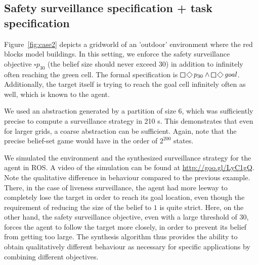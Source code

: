 \subsection{Safety surveillance specification + task specification}
Figure~\ref{fig:case2} depicts a gridworld of an 'outdoor' environment where the red blocks model buildings. 
In this setting, we enforce the safety surveillance objective $\square p_{30}$ (the belief size should never exceed 30) in addition to infinitely often reaching the green cell. The formal specification is $\LTLglobally\LTLfinally p_{30} \wedge \LTLglobally\LTLfinally \mathit{goal}$. Additionally, the target itself is trying to reach the goal cell infinitely often as well, which is known to the agent.

We used an abstraction generated by a partition of size 6, which was sufficiently precise to compute a surveillance strategy in 210 s. This demonstrates that even for larger grids, a coarse abstraction can be sufficient. Again, note that the precise belief-set game would have in the order of $2^{200}$ states.
 
We simulated the environment and the synthesized surveillance strategy for the agent in ROS. A video of the simulation can be found at \url{http://goo.gl/LyC1gQ}. Note the qualitative difference in behaviour compared to the previous example. There, in the case of liveness surveillance, the agent had more leeway to completely lose the target in order to reach its goal location, even though the requirement of reducing the size of the belief to $1$ is quite strict. Here, on the other hand, the safety surveillance objective, even with a large threshold of $30$, forces the agent to follow the target more closely, in order to prevent its belief from getting too large. The synthesis algorithm thus provides the ability to obtain qualitatively different behaviour as necessary for specific applications by combining different objectives. 


